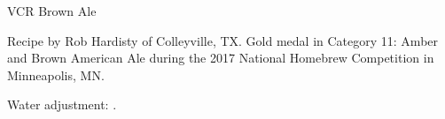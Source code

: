 \begin{recipe}{VCR Brown Ale} %

\begin{aboutblock}
Recipe by Rob Hardisty of Colleyville, TX. Gold medal in Category 11: Amber and
Brown American Ale during the 2017 National Homebrew Competition in Minneapolis, MN.
\sourceaha
\end{aboutblock}


\begin{methodandtiming}

\begin{mashsteps}
\end{mashsteps}

\begin{fermentationsteps}
\end{fermentationsteps}

\begin{directions}
Water adjustment: .
\end{directions}

\end{methodandtiming}

\recipebreak

\begin{ingredientsblock}

\begin{malts}
\end{malts}

\begin{hops}
\end{hops}


\end{ingredientsblock}

\end{recipe}

